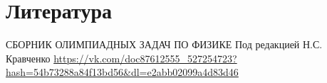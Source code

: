 \documentclass[a4paper,12pt]{article} %
\begin{document}
\section{Литература}
\begin{thebibliography}{}
     СБОРНИК ОЛИМПИАДНЫХ ЗАДАЧ ПО ФИЗИКЕ Под редакцией Н.С. Кравченко
     \url{https://vk.com/doc87612555_527254723?hash=54b73288a84f13bd56&dl=e2abb02099a4d83d46}
	
\end{thebibliography}
\end{document}
